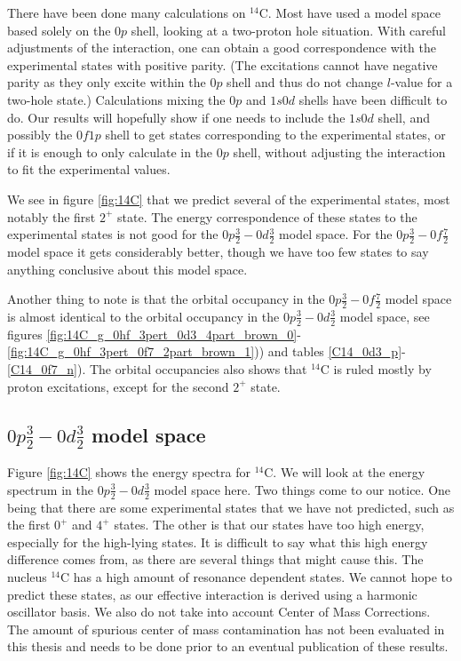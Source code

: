 There have been done many calculations on $^{14}$C. Most have used a
model space based solely on the $0p$ shell, looking at a two-proton hole
situation. With careful adjustments of the interaction, one can obtain a 
good correspondence with the experimental states with positive parity. (The
excitations cannot have negative parity as they only excite within the $0p$
shell and thus do not change $l$-value for a two-hole state.) Calculations mixing the $0p$ and
$1s0d$ shells have been difficult to do. Our results will hopefully show if one
needs to include the $1s0d$ shell, and possibly the $0f1p$ shell to get states
corresponding to the experimental states, or if it is enough to only calculate
in the $0p$ shell, without adjusting the interaction to fit the experimental
values.

We see in figure \ref{fig:14C} that we predict several of the experimental
states, most notably the first $2^+$ state. The energy correspondence of these
states to the experimental states is not good for the $0p\frac32-0d\frac32$
model space. For the $0p\frac32-0f\frac72$ model space it gets considerably
better, though we have too few states to say anything conclusive about this
model space.

Another thing to note is that the orbital occupancy in the
$0p\frac32-0f\frac72$ model space is almost identical to the orbital occupancy
in the $0p\frac32-0d\frac32$ model space, see figures
\ref{fig:14C_g_0hf_3pert_0d3_4part_brown_0}-\ref{fig:14C_g_0hf_3pert_0f7_2part_brown_1}))
and tables \ref{C14_0d3_p}-\ref{C14_0f7_n}). The orbital occupancies also shows
that $^{14}$C is ruled mostly by proton excitations, except for the second
$2^+$ state.

\subsection{$0p\frac32-0d\frac32$ model space}

Figure \ref{fig:14C} shows the energy spectra for $^{14}$C. We will look at the
energy spectrum in the $0p\frac32-0d\frac32$ model space here. Two things
come to our notice. One being that there are some experimental
states that we have not predicted, such as the first $0^+$ and $4^+$ states.
The other is that our states have too high energy, especially for the
high-lying states. It is difficult to say what this high energy difference
comes from, as there are several things that might cause this. The nucleus $^{14}$C has a
high amount of resonance dependent states. We cannot hope to predict these
states, as our effective interaction is derived using a harmonic oscillator basis. We also do not take into
account Center of Mass Corrections. The amount of spurious center of mass contamination has not been
evaluated in this thesis and needs to be done prior to an eventual publication of these results.

